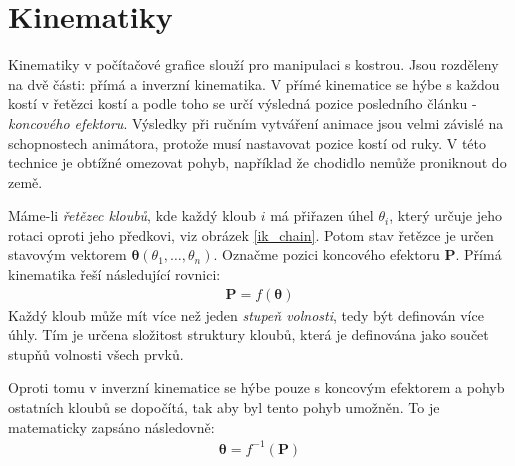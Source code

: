 \chapter{Kinematiky} 
\label{kinematics}
Kinematiky v počítačové grafice slouží pro manipulaci s kostrou. Jsou  rozděleny na dvě části: přímá a inverzní kinematika. V přímé kinematice se hýbe s každou kostí v řetězci kostí a podle toho se určí výsledná pozice posledního článku - \textit{koncového efektoru}. Výsledky při ručním vytváření animace jsou velmi závislé na schopnostech animátora, protože musí nastavovat pozice kostí od ruky. V této technice je obtížné omezovat pohyb, například že chodidlo nemůže proniknout do země. 

Máme-li \textit{řetězec kloubů}, kde každý kloub $i$ má přiřazen úhel $\theta_i$, který určuje jeho rotaci oproti jeho předkovi, viz obrázek \ref{ik_chain}. Potom stav řetězce je určen stavovým vektorem $\boldsymbol{\theta}(\theta_1,\dots,\theta_n)$. Označme pozici koncového efektoru $\mathbf{P}$. Přímá kinematika řeší následující rovnici:
\begin{eqnarray}
\mathbf{P} = f(\boldsymbol{\theta})\label{r.forward_kinematics}
\end{eqnarray}
Každý kloub může mít více než jeden \textit{stupeň volnosti}, tedy být definován více úhly. Tím je určena složitost struktury kloubů, která je definována jako součet stupňů volnosti všech prvků.

Oproti tomu v inverzní kinematice \cite{Buss09introductionto,welman} se hýbe pouze s koncovým efektorem a pohyb ostatních kloubů se dopočítá, tak aby byl tento pohyb umožněn. To je matematicky zapsáno následovně:
\begin{eqnarray}
\boldsymbol{\theta} = f^{-1}(\mathbf{P})\label{r.inverse_kinematics}
\end{eqnarray}

